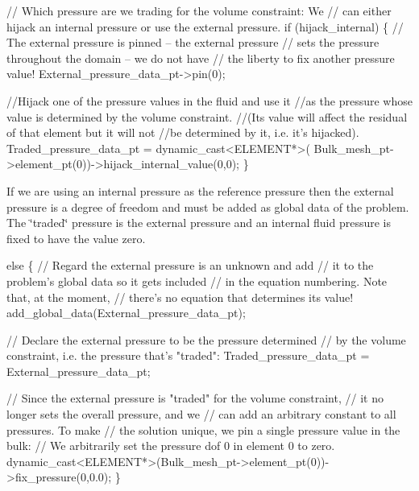 \begin{DoxyCodeInclude}

 \textcolor{comment}{// Which pressure are we trading for the volume constraint: We }
 \textcolor{comment}{// can either hijack an internal pressure or use the external pressure.}
 \textcolor{keywordflow}{if} (hijack\_internal)
  \{
   \textcolor{comment}{// The external pressure is pinned -- the external pressure}
   \textcolor{comment}{// sets the pressure throughout the domain -- we do not have}
   \textcolor{comment}{// the liberty to fix another pressure value!}
   External\_pressure\_data\_pt->pin(0);

   \textcolor{comment}{//Hijack one of the pressure values in the fluid and use it }
   \textcolor{comment}{//as the pressure whose value is determined by the volume constraint.}
   \textcolor{comment}{//(Its value will affect the residual of that element but it will not}
   \textcolor{comment}{//be determined by it, i.e. it's hijacked).}
   Traded\_pressure\_data\_pt = \textcolor{keyword}{dynamic\_cast<}ELEMENT*\textcolor{keyword}{>}(
    Bulk\_mesh\_pt->element\_pt(0))->hijack\_internal\_value(0,0);
  \}

\end{DoxyCodeInclude}


If we are using an internal pressure as the reference pressure then the external pressure is a degree of freedom and must be added as global data of the problem. The \char`\"{}traded\char`\"{} pressure is the external pressure and an internal fluid pressure is fixed to have the value zero.


\begin{DoxyCodeInclude}
 \textcolor{keywordflow}{else}
  \{
   \textcolor{comment}{// Regard the external pressure is an unknown and add}
   \textcolor{comment}{// it to the problem's global data so it gets included}
   \textcolor{comment}{// in the equation numbering. Note that, at the moment,}
   \textcolor{comment}{// there's no equation that determines its value!}
   add\_global\_data(External\_pressure\_data\_pt);

   \textcolor{comment}{// Declare the external pressure to be the pressure determined}
   \textcolor{comment}{// by the volume constraint, i.e. the pressure that's "traded":}
   Traded\_pressure\_data\_pt = External\_pressure\_data\_pt;

   \textcolor{comment}{// Since the external pressure is "traded" for the volume constraint,}
   \textcolor{comment}{// it no longer sets the overall pressure, and we }
   \textcolor{comment}{// can add an arbitrary constant to all pressures. To make }
   \textcolor{comment}{// the solution unique, we pin a single pressure value in the bulk: }
   \textcolor{comment}{// We arbitrarily set the pressure dof 0 in element 0 to zero.}
   \textcolor{keyword}{dynamic\_cast<}ELEMENT*\textcolor{keyword}{>}(Bulk\_mesh\_pt->element\_pt(0))->fix\_pressure(0,0.0);
  \}

\end{DoxyCodeInclude}



